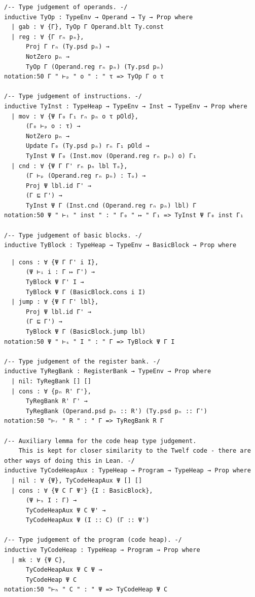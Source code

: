 \documentclass[]{NobArticle}
\begin{document}
\begin{minipage}{\linewidth}
\begin{lstlisting}
/-- Type judgement of operands. -/
inductive TyOp : TypeEnv → Operand → Ty → Prop where
  | gab : ∀ {Γ}, TyOp Γ Operand.blt Ty.const
  | reg : ∀ {Γ rₙ pₙ},
      Proj Γ rₙ (Ty.psd pₙ) →
      NotZero pₙ →
      TyOp Γ (Operand.reg rₙ pₙ) (Ty.psd pₙ)
notation:50 Γ " ⊢ₚ " o " : " τ => TyOp Γ o τ

/-- Type judgement of instructions. -/
inductive TyInst : TypeHeap → TypeEnv → Inst → TypeEnv → Prop where
  | mov : ∀ {Ψ Γ₀ Γ₁ rₙ pₙ o τ pOld},
      (Γ₀ ⊢ₚ o : τ) →
      NotZero pₙ →
      Update Γ₀ (Ty.psd pₙ) rₙ Γ₁ pOld →
      TyInst Ψ Γ₀ (Inst.mov (Operand.reg rₙ pₙ) o) Γ₁
  | cnd : ∀ {Ψ Γ Γ' rₙ pₙ lbl Tₒ},
      (Γ ⊢ₚ (Operand.reg rₙ pₙ) : Tₒ) →
      Proj Ψ lbl.id Γ' →
      (Γ ⊑ Γ') →
      TyInst Ψ Γ (Inst.cnd (Operand.reg rₙ pₙ) lbl) Γ
notation:50 Ψ " ⊢ᵢ " inst " : " Γ₀ " ↦ " Γ₁ => TyInst Ψ Γ₀ inst Γ₁

/-- Type judgement of basic blocks. -/
inductive TyBlock : TypeHeap → TypeEnv → BasicBlock → Prop where
\end{lstlisting}
\end{minipage}

\newpage

\begin{minipage}{\linewidth}
\begin{lstlisting}
  | cons : ∀ {Ψ Γ Γ' i I},
      (Ψ ⊢ᵢ i : Γ ↦ Γ') →
      TyBlock Ψ Γ' I →
      TyBlock Ψ Γ (BasicBlock.cons i I)
  | jump : ∀ {Ψ Γ Γ' lbl},
      Proj Ψ lbl.id Γ' →
      (Γ ⊑ Γ') →
      TyBlock Ψ Γ (BasicBlock.jump lbl)
notation:50 Ψ " ⊢ₛ " I " : " Γ => TyBlock Ψ Γ I

/-- Type judgement of the register bank. -/
inductive TyRegBank : RegisterBank → TypeEnv → Prop where
  | nil: TyRegBank [] []
  | cons : ∀ {pₙ R' Γ'},
      TyRegBank R' Γ' →
      TyRegBank (Operand.psd pₙ :: R') (Ty.psd pₙ :: Γ')
notation:50 "⊢ᵣ " R " : " Γ => TyRegBank R Γ

/-- Auxiliary lemma for the code heap type judgement.
    This is kept for closer similarity to the Twelf code - there are other ways of doing this in Lean. -/
inductive TyCodeHeapAux : TypeHeap → Program → TypeHeap → Prop where
  | nil : ∀ {Ψ}, TyCodeHeapAux Ψ [] []
  | cons : ∀ {Ψ C Γ Ψ'} {I : BasicBlock},
      (Ψ ⊢ₛ I : Γ) →
      TyCodeHeapAux Ψ C Ψ' →
      TyCodeHeapAux Ψ (I :: C) (Γ :: Ψ')

/-- Type judgement of the program (code heap). -/
inductive TyCodeHeap : TypeHeap → Program → Prop where
  | mk : ∀ {Ψ C},
      TyCodeHeapAux Ψ C Ψ →
      TyCodeHeap Ψ C
notation:50 "⊢ₕ " C " : " Ψ => TyCodeHeap Ψ C
\end{lstlisting}
\end{minipage}
\end{document}
